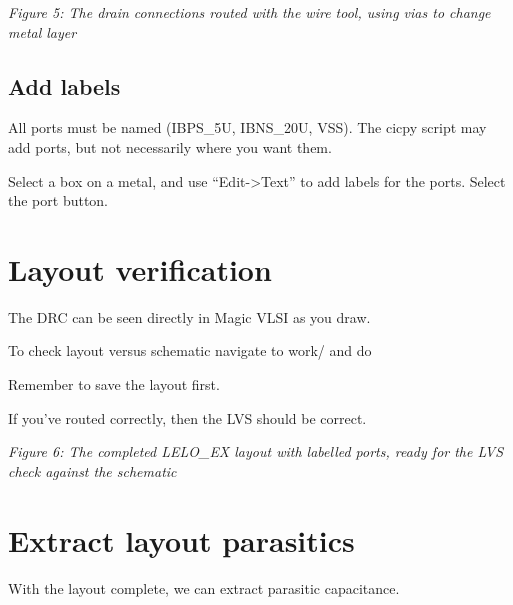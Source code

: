 {
\centering
{}
}

\emph{Figure 5: The drain connections routed with the wire tool, using
vias to change metal layer}

\subsection{Add labels}\label{add-labels}

All ports must be named (IBPS\_5U, IBNS\_20U, VSS). The cicpy script may
add ports, but not necessarily where you want them.

Select a box on a metal, and use ``Edit-\textgreater Text'' to add
labels for the ports. Select the port button.

\section{\texorpdfstring{Layout verification
}{Layout verification }}\label{layout-verification}

The DRC can be seen directly in Magic VLSI as you draw.

To check layout versus schematic navigate to work/ and do

\begin{Shaded}
\begin{Highlighting}[]
\end{Highlighting}
\end{Shaded}

Remember to save the layout first.

If you've routed correctly, then the LVS should be correct.


{
\centering
{}
}

\emph{Figure 6: The completed LELO\_EX layout with labelled ports, ready
for the LVS check against the schematic}

\section{\texorpdfstring{Extract layout parasitics
}{Extract layout parasitics }}\label{extract-layout-parasitics}

With the layout complete, we can extract parasitic capacitance.

\begin{Shaded}
\begin{Highlighting}[]
\end{Highlighting}
\end{Shaded}

